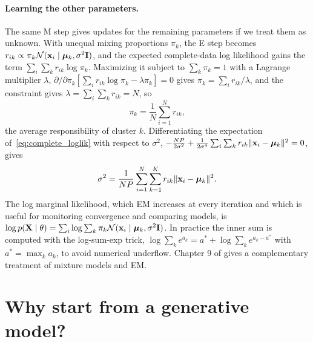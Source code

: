 \paragraph{Learning the other parameters.} The same M step gives updates for the remaining parameters if we treat them as unknown. With unequal mixing proportions $\pi_k$, the E step becomes $r_{ik}\propto\pi_k\mathcal{N}(\mathbf{x}_i\mid\boldsymbol{\mu}_k,\sigma^2\mathbf{I})$, and the expected complete-data log likelihood gains the term $\sum_i\sum_k r_{ik}\log\pi_k$. Maximizing it subject to $\sum_k\pi_k=1$ with a Lagrange multiplier $\lambda$, $\partial/\partial\pi_k\left[\sum_i r_{ik}\log\pi_k-\lambda\pi_k\right]=0$ gives $\pi_k=\sum_i r_{ik}/\lambda$, and the constraint gives $\lambda=\sum_i\sum_k r_{ik}=N$, so
\begin{equation}
  \pi_k = \frac{1}{N}\sum_{i=1}^N r_{ik},
\end{equation}
the average responsibility of cluster $k$. Differentiating the expectation of~\eqref{eq:complete_loglik} with respect to $\sigma^2$, $-\frac{NP}{2\sigma^2}+\frac{1}{2\sigma^4}\sum_i\sum_k r_{ik}\|\mathbf{x}_i-\boldsymbol{\mu}_k\|^2=0$, gives
\begin{equation}
  \sigma^2 = \frac{1}{NP}\sum_{i=1}^N\sum_{k=1}^K r_{ik}\|\mathbf{x}_i-\boldsymbol{\mu}_k\|^2 .
\end{equation}
The log marginal likelihood, which EM increases at every iteration and which is useful for monitoring convergence and comparing models, is $\log p(\mathbf{X}\mid\theta)=\sum_i\log\sum_k\pi_k\mathcal{N}(\mathbf{x}_i\mid\boldsymbol{\mu}_k,\sigma^2\mathbf{I})$. In practice the inner sum is computed with the log-sum-exp trick, $\log\sum_k e^{a_k}=a^*+\log\sum_k e^{a_k-a^*}$ with $a^*=\max_k a_k$, to avoid numerical underflow. Chapter 9 of \citet{bishop2006} gives a complementary treatment of mixture models and EM.

\section{Why start from a generative model?}

